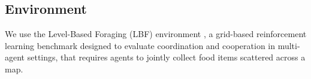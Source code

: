 \documentclass{article}
\begin{document}
        
        
        

\vspace{3em}





    
\subsection{Environment}

We use the Level-Based Foraging (LBF) environment \cite{papoudakis2021},
a grid-based reinforcement learning benchmark designed to evaluate 
coordination and cooperation in multi-agent settings,
that requires agents to jointly collect food items scattered across a map. 
\end{document}
